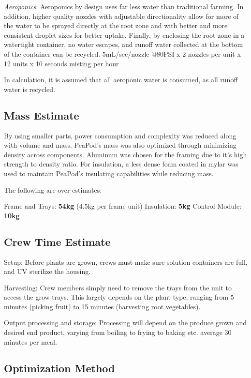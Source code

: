 \documentclass{../tex/report}
\begin{document}
\begin{spacing}{0.5}
\textit{Aeroponics}: Aeroponics by design uses far less water than traditional farming. In addition, higher quality nozzles with adjustable directionality allow for more of the water to be sprayed directly at the root zone and with better and more consistent droplet sizes for better uptake. Finally, by enclosing the root zone in a watertight container, no water escapes, and runoff water collected at the bottom of the container can be recycled. 5mL/sec/nozzle @80PSI x 2 nozzles per unit x 12 units x 10 seconds misting per hour

In calculation, it is assumed that all aeroponic water is consumed, as all runoff water is recycled.

\subsection{Mass Estimate}
\label{app:mass}

By using smaller parts, power consumption and complexity was reduced along with volume and mass. PeaPod's mass was also optimized through minimizing density across components. Aluminum was chosen for the framing due to it's high strength to density ratio. For insulation, a less dense foam coated in mylar was used to maintain PeaPod's insulating capabilities while reducing mass.

The following are over-estimates:

Frame and Trays: \textbf{54kg} (4.5kg per frame unit)
Insulation: \textbf{5kg}
Control Module: \textbf{10kg}

\subsection{Crew Time Estimate}
\label{app:crewtime}

Setup: Before plants are grown, crews must make sure solution containers are full, and UV sterilize the housing.

Harvesting: Crew members simply need to remove the trays from the unit to access the grow trays. This largely depends on the plant type, ranging from 5 minutes (picking fruit) to 15 minutes (harvesting root vegetables).

Output processing and storage: Processing will depend on the produce grown and desired end product, varying from boiling to frying to baking etc. average 30 minutes per meal.

\subsection{Optimization Method}
\label{app:optimization}


\end{spacing}
\end{document}
